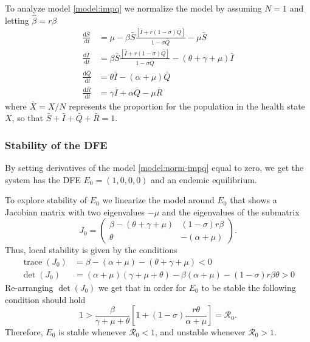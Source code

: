 \documentclass{book}\usepackage[]{graphicx}\usepackage[]{color}
\begin{document}
To analyze model \eqref{model:impq} we normalize the model by assuming $N=1$ and letting $\hat{\beta}=r\beta$
%
\begin{equation}
\label{model:norm-impq}
\begin{split}
\frac{\mathrm{d} \bar{S}}{\mathrm{~d} t} &= \mu-\beta \bar{S} \frac{[\bar{I}+r(1-\sigma) \bar{Q}]}{1-\sigma \bar{Q}}-\mu \bar{S} \\
\frac{\mathrm{d} \bar{I}}{\mathrm{~d} t}&=\beta \bar{S} \frac{[\bar{I}+r(1-\sigma) \bar{Q}]}{1-\sigma \bar{Q}}-(\theta+\gamma+\mu) \bar{I} \\
\frac{\mathrm{d} \bar{Q}}{\mathrm{~d} t}&=\theta \bar{I}-(\alpha+\mu) \bar{Q} \\
\frac{\mathrm{d} \bar{R}}{\mathrm{~d} t}&=\gamma \bar{I}+\alpha \bar{Q}-\mu \bar{R}
\end{split}
\end{equation}
%
where $\bar{X}=X/N$ represents the proportion for the population in the health state $X$, so that $\bar{S}+\bar{I}+\bar{Q}+\bar{R}=1$.

\subsubsection*{Stability of the DFE}
By setting derivatives of the model \eqref{model:norm-impq} equal to zero, we get the system has the DFE $E_0=(1,0,0,0)$ and an endemic equilibrium.

To explore stability of $E_0$ we linearize the model around $E_0$ that shows a Jacobian matrix with two eigenvalues $-\mu$ and the eigenvalues of the submatrix
\begin{equation}
J_{0}=\left(\begin{array}{cc}
\beta-(\theta+\gamma+\mu) & (1-\sigma) r \beta \\
\theta & -(\alpha+\mu)
\end{array}\right).
\end{equation}
Thus, local stability is given by the conditions
\begin{align}
\operatorname{trace}\left(J_{0}\right)&=\beta-(\alpha+\mu)-(\theta+\gamma+\mu)<0\\
\operatorname{det}\left(J_{0}\right)&=(\alpha+\mu)(\gamma+\mu+\theta)-\beta(\alpha+\mu)-(1-\sigma) r \beta \theta>0
\end{align}
%
Re-arranging $\operatorname{det}\left(J_{0}\right)$ we get that in order for $E_0$ to be stable the following condition should hold
\begin{equation}
1>\frac{\beta}{\gamma+\mu+\theta}\left[1+(1-\sigma) \frac{r \theta}{\alpha+\mu}\right]=\mathcal{R}_0.
\end{equation}
Therefore, $E_0$ is stable whenever $\mathcal{R}_0<1$, and unstable whenever $\mathcal{R}_0>1$.
\end{document}
